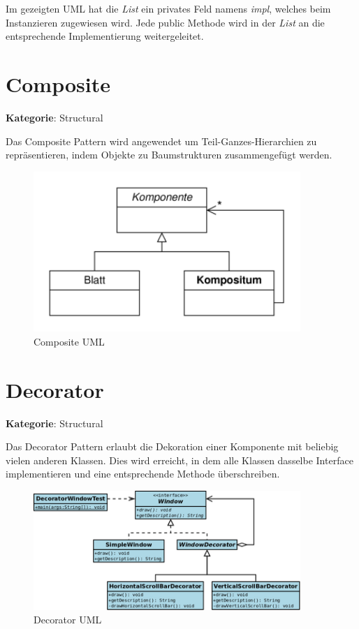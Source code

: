 Im gezeigten UML hat die \textit{List} ein privates Feld namens \textit{impl}, welches beim Instanzieren zugewiesen wird. Jede public Methode wird in der \textit{List} an die entsprechende Implementierung weitergeleitet.

\section{Composite}
\textbf{Kategorie}: Structural

Das Composite Pattern wird angewendet um Teil-Ganzes-Hierarchien zu repräsentieren, indem Objekte zu Baumstrukturen zusammengefügt werden.

\begin{figure}[H]
	\centering
	\includegraphics[width=0.9\textwidth]{content/gof/images/07-composite-uml.png}
	\caption{Composite UML}
\end{figure}


\section{Decorator}
\textbf{Kategorie}: Structural

Das Decorator Pattern erlaubt die Dekoration einer Komponente mit beliebig vielen anderen Klassen. Dies wird erreicht, in dem alle Klassen dasselbe Interface implementieren und eine entsprechende Methode überschreiben.

\begin{figure}[H]
	\centering
	\includegraphics[width=0.9\textwidth]{content/gof/images/08-decorator-example-uml.png}
	\caption{Decorator UML}
\end{figure}


